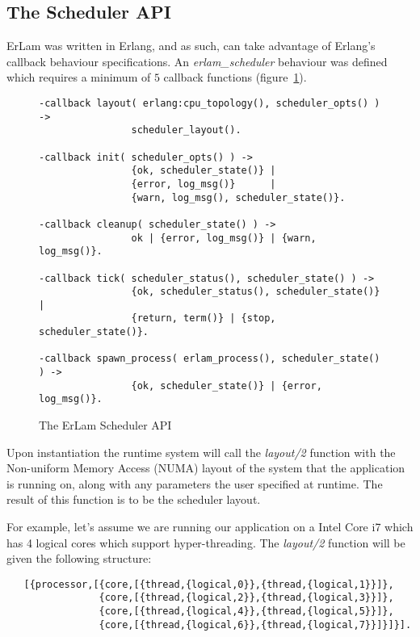 \subsection{The Scheduler API}\label{sec:the scheduler api}

ErLam was written in Erlang, and as such, can take advantage of Erlang's 
callback behaviour specifications. An \emph{erlam\_scheduler} behaviour was
defined which requires a minimum of $5$ callback functions 
(figure~\ref{fig:scheduler-api}).

\begin{figure}
    \begin{verbatim}
-callback layout( erlang:cpu_topology(), scheduler_opts() ) -> 
                scheduler_layout().

-callback init( scheduler_opts() ) -> 
                {ok, scheduler_state()} |
                {error, log_msg()}      |
                {warn, log_msg(), scheduler_state()}.

-callback cleanup( scheduler_state() ) -> 
                ok | {error, log_msg()} | {warn, log_msg()}.

-callback tick( scheduler_status(), scheduler_state() ) -> 
                {ok, scheduler_status(), scheduler_state()} |
                {return, term()} | {stop, scheduler_state()}. 

-callback spawn_process( erlam_process(), scheduler_state() ) -> 
                {ok, scheduler_state()} | {error, log_msg()}.
\end{verbatim}
\caption{The ErLam Scheduler API}
\label{fig:scheduler-api}
\end{figure}

Upon instantiation the runtime system will call the 
\emph{layout/2} function with the Non-uniform Memory Access (NUMA) layout 
of the system that the application is
running on, along with any parameters the user specified at runtime. The 
result of this function is to be the scheduler layout. 

For example, let's assume we are running our application on a Intel Core i7 
which has 4 logical cores which support hyper-threading. The \emph{layout/2}
function will be given the following structure: 

{\footnotesize 
\begin{verbatim}
   [{processor,[{core,[{thread,{logical,0}},{thread,{logical,1}}]},
                {core,[{thread,{logical,2}},{thread,{logical,3}}]},
                {core,[{thread,{logical,4}},{thread,{logical,5}}]},
                {core,[{thread,{logical,6}},{thread,{logical,7}}]}]}].
\end{verbatim}
} 

